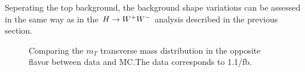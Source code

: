 Seperating the top background, the \WW{} background shape variations can be assessed 
in the same way as in the $H\to W^+W^-$ analysis described in the previous section.


\begin{figure}[!htbp]
\begin{center}
\label{fig:mtemdatamc}
\caption{Comparing the $m_T$ transverse mass distribution in the opposite flavor between data and MC.The data corresponds to 1.1/fb.}
\end{center}
\end{figure}

